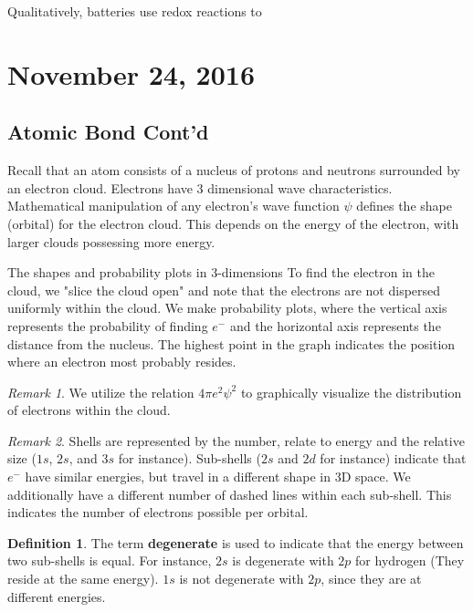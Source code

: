 \documentclass[11pt]{article}
\theoremstyle{plain} %
\theoremstyle{definition}
\newtheorem*{definition}{Definition} %
\theoremstyle{example}
\theoremstyle{remark}
\newtheorem*{remark}{Remark}
\begin{document}
Qualitatively, batteries use redox reactions to 

\section{November 24, 2016}
\subsection{Atomic Bond Cont'd}

Recall that an atom consists of a nucleus of protons and neutrons surrounded by an electron cloud. Electrons have 3 dimensional wave characteristics. Mathematical manipulation of any electron's wave function $\psi$ defines the shape (orbital) for the electron cloud. This depends on the energy of the electron, with larger clouds possessing more energy. 

The shapes and probability plots in 3-dimensions 
To find the electron in the cloud, we "slice the cloud open" and note that the electrons are not dispersed uniformly within the cloud. We make probability plots, where the vertical axis represents the probability of finding $e^-$ and the horizontal axis represents the distance from the nucleus. The highest point in the graph indicates the position where an electron most probably resides. 

\begin{remark}
We utilize the relation $4 \pi e^2 \psi^2$ to graphically visualize the distribution of electrons within the cloud. 
\end{remark}

\begin{remark}
Shells are represented by the number, relate to energy and the relative size ($1s$, $2s$, and $3s$ for instance). Sub-shells ($2s$ and $2d$ for instance) indicate that $e^-$ have similar energies, but travel in a different shape in 3D space. We additionally have a different number of dashed lines within each sub-shell. This indicates the number of electrons possible per orbital. 
\end{remark}

\begin{definition}
The term \textbf{degenerate} is used to indicate that the energy between two sub-shells is equal. For instance, $2s$ is degenerate with $2p$ for hydrogen (They reside at the same energy). $1s$ is not degenerate with $2p$, since they are at different energies.
\end{definition}
\end{document}

